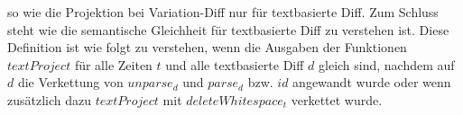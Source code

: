 so wie die Projektion bei Variation-Diff nur für textbasierte Diff. Zum Schluss steht wie die semantische Gleichheit für textbasierte Diff zu verstehen ist. Diese Definition ist wie folgt zu verstehen, wenn die Ausgaben der Funktionen $textProject$ für alle Zeiten $t$ und alle textbasierte Diff $d$ gleich sind, nachdem auf $d$ die Verkettung von $unparse_d$ und $parse_d$ bzw. $id$ angewandt wurde oder wenn zusätzlich dazu  $textProject$ mit  $deleteWhitespace_t$ verkettet wurde.



